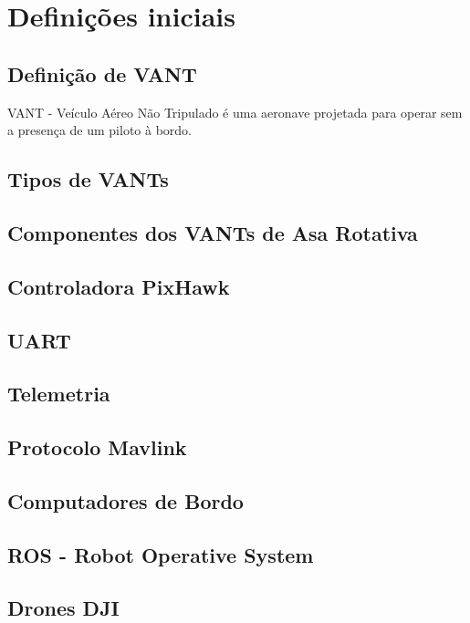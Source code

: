 \documentclass[12pt,a4paper,oneside]{book}
\begin{document}
\section{Definições iniciais}

\subsection{Definição de VANT}
VANT - Veículo Aéreo Não Tripulado é uma aeronave projetada para operar sem a presença de um piloto à bordo. 

\subsection{Tipos de VANTs}

\subsection{Componentes dos VANTs de Asa Rotativa}

\subsection{Controladora PixHawk}

\subsection{UART}

\subsection{Telemetria}

\subsection{Protocolo Mavlink}

\subsection{Computadores de Bordo}

\subsection{ROS - Robot Operative System}

\subsection{Drones DJI}
\end{document}
